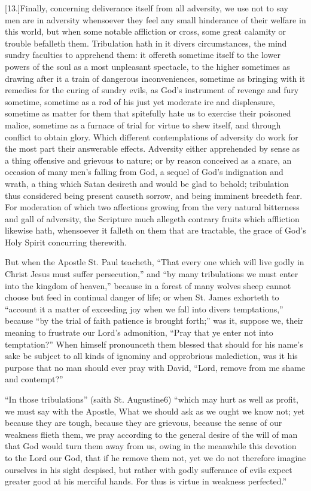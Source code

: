 [13.]Finally, concerning deliverance itself from all adversity, we use not to say men are in adversity whensoever they feel any small hinderance of their welfare in this world, but when some notable affliction or cross, some great calamity or trouble befalleth them. Tribulation hath in it divers circumstances, the mind sundry faculties to apprehend them: it offereth sometime itself to the lower powers of the soul as a most unpleasant spectacle, to the higher sometimes as drawing after it a train of dangerous inconveniences, sometime as bringing with it remedies for the curing of sundry evils, as God’s instrument of revenge and fury sometime, sometime as a rod of his just yet moderate ire and displeasure, sometime as matter for them that spitefully hate us to exercise their poisoned malice, sometime as a furnace of trial for virtue to shew itself, and through conflict to obtain glory. Which different contemplations of adversity do work  for the most part their answerable effects. Adversity either apprehended by sense as a thing offensive and grievous to nature; or by reason conceived as a snare, an occasion of many men’s falling from God, a sequel of God’s indignation and wrath, a thing which Satan desireth and would be glad to behold; tribulation thus considered being present causeth sorrow, and being imminent breedeth fear. For moderation of which two affections growing from the very natural bitterness and gall of adversity, the Scripture much allegeth contrary fruits which affliction likewise hath, whensoever it falleth on them that are tractable, the grace of God’s Holy Spirit concurring therewith.

But when the Apostle St. Paul teacheth, “That every one which will live godly in Christ Jesus must suffer persecution,” and “by many tribulations we must enter into the kingdom of heaven,” because in a forest of many wolves sheep cannot choose but feed in continual danger of life; or when St. James exhorteth to “account it a matter of exceeding joy when we fall into divers temptations,” because “by the trial of faith patience is brought forth;” was it, suppose we, their meaning to frustrate our Lord’s admonition, “Pray that ye enter not into temptation?” When himself pronounceth them blessed that should for his name’s sake be subject to all kinds of ignominy and opprobrious malediction, was it his purpose that no man should ever pray with David, “Lord, remove from me shame and contempt?”

“In those tribulations” (saith St. Augustine6) “which may hurt as well as profit, we must say with the Apostle, What we should ask as we ought we know not; yet because they are tough, because they are grievous, because the sense of our weakness flieth them, we pray according to the  general desire of the will of man that God would turn them away from us,
 owing in the meanwhile this devotion to the Lord our God, that if he remove them not, yet we do not therefore imagine ourselves in his sight despised, but rather with godly sufferance of evils expect greater good at his merciful hands. For thus is virtue in weakness perfected.”

